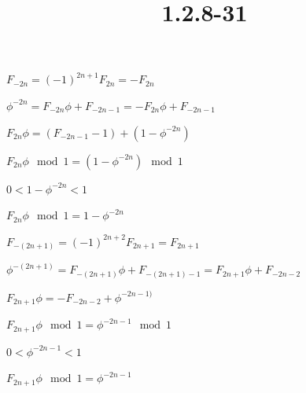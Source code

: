 \documentclass{article}
\title{1.2.8-31}
\begin{document}
\maketitle

\( F_{-2n} = (-1)^{2n+1} F_{2n} = -F_{2n} \)

\( \phi^{-2n} = F_{-2n}\phi + F_{-2n-1} = -F_{2n}\phi + F_{-2n-1} \)

\( F_{2n}\phi = (F_{-2n-1} - 1) + (1 - \phi^{-2n}) \)

\( F_{2n}\phi \mod 1 = (1 - \phi^{-2n}) \mod 1 \)

\( 0 < 1 - \phi^{-2n} < 1 \)

\( F_{2n}\phi \mod 1 = 1 - \phi^{-2n} \)

\( F_{-(2n+1)} = (-1)^{2n+2} F_{2n+1} = F_{2n+1} \)

\( \phi^{-(2n+1)} = F_{-(2n+1)}\phi + F_{-(2n+1)-1} = F_{2n+1}\phi + F_{-2n-2} \)

\( F_{2n+1}\phi = -F_{-2n-2} + \phi^{-2n-1)} \)

\( F_{2n+1}\phi \mod 1 = \phi^{-2n-1} \mod 1 \)

\( 0 < \phi^{-2n-1} < 1 \)

\( F_{2n+1}\phi \mod 1 = \phi^{-2n-1} \)
\end{document}
